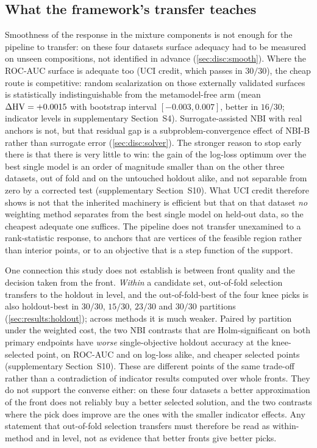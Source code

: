 \subsection{What the framework's transfer teaches}
\label{sec:disc:transfer}

Smoothness of the response in the mixture components is not enough for the pipeline to transfer: on these four
datasets surface adequacy had to be measured on unseen compositions, not identified in advance (\cref{sec:disc:smooth}).
Where the ROC-AUC surface is adequate too (UCI credit, which passes in $30/30$), the cheap route is competitive:
random scalarization on those externally validated surfaces is statistically indistinguishable from the
metamodel-free arm (mean $\Delta\mathrm{HV} = +0.0015$ with bootstrap interval $[-0.003, 0.007]$, better in $16/30$;
indicator levels in supplementary Section~S4). Surrogate-assisted NBI with real anchors is not, but that
residual gap is a subproblem-convergence effect of NBI-B rather than surrogate error
(\cref{sec:disc:solver}). The stronger reason to stop early there is that there is very little to win: the gain of the
log-loss optimum over the best single model is an order of magnitude smaller than on the other three datasets, out of
fold and on the untouched holdout alike, and not separable from zero by a corrected test (supplementary
Section~S10). What UCI credit therefore shows is not that the inherited machinery is efficient but that on that
dataset \emph{no} weighting method separates from the best single model on held-out data, so the cheapest adequate
one suffices. The pipeline does not
transfer unexamined to a rank-statistic response, to anchors that are vertices of the feasible region rather than
interior points, or to an objective that is a step function of the support.

One connection this study does not establish is between front quality and the decision taken from the front.
\emph{Within} a candidate set, out-of-fold selection transfers to the holdout in level, and the out-of-fold-best of
the four knee picks is also holdout-best in $30/30$, $15/30$, $23/30$ and $30/30$ partitions
(\cref{sec:results:holdout}); across methods it is much weaker. Paired by partition under the weighted cost, the two
NBI contrasts that are Holm-significant on both primary endpoints have \emph{worse} single-objective holdout accuracy at
the knee-selected point, on ROC-AUC and on log-loss alike, and cheaper selected points (supplementary Section~S10).
These are different points of the same trade-off rather than a contradiction of indicator results computed over whole
fronts. They do not support the converse either: on these four datasets a better approximation of the front does not
reliably buy a better selected solution, and the two contrasts where the pick does improve are the ones with the
smaller indicator effects. Any statement that out-of-fold selection transfers must therefore be read as within-method
and in level, not as evidence that better fronts give better picks.
